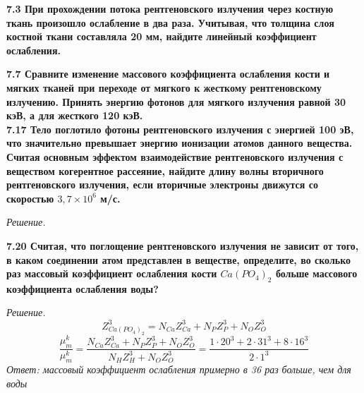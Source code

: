 \documentclass[a4paper, fontsize=14pt]{extreport}
\begin{document}
\textbf{7.3 При прохождении потока рентгеновского излучения через костную ткань произошло ослабление в два раза. Учитывая, что толщина слоя костной ткани составляла 20 мм, найдите линейный коэффициент ослабления.}
%
%
%
%

\textbf{7.7 Сравните изменение массового коэффициента ослабления кости и мягких тканей при переходе от мягкого к жесткому рентгеновскому излучению. Принять энергию фотонов для мягкого излучения равной 30 кэВ, а для жесткого 120 кэВ.} \\
%
%
%
%

\textbf{7.17 Тело поглотило фотоны рентгеновского излучения с энергией 100 эВ, что значительно превышает энергию ионизации атомов данного вещества. Считая основным эффектом взаимодействие рентгеновского излучения с веществом когерентное рассеяние, найдите длину волны вторичного рентгеновского излучения, если вторичные электроны движутся со скоростью $3,7 \times 10^6$ м/с.}

\textit{Решение.\\
%
}

\textbf{7.20 Считая, что поглощение рентгеновского излучения не зависит от того, в каком соединении атом представлен в веществе, определите, во сколько раз массовый коэффициент ослабления кости $Ca(PO_4)_2$ больше массового коэффициента ослабления воды? }

\textit{Решение.\\
%
\begin{equation}
  Z_{Ca(PO_4)_2}^3 = N_{Ca}Z_{Ca}^3+N_{P}Z_{P}^3+N_{O}Z_{O}^3
\end{equation}
\begin{equation}
  \frac{\mu_m^k}{\mu_m^k} = \frac{N_{Ca}Z_{Ca}^3+N_{P}Z_{P}^3+N_{O}Z_{O}^3}{N_{H}Z_{H}^3+N_{O}Z_{O}^3} = \frac{1 \cdot 20^3 + 2 \cdot 31^3 + 8 \cdot 16^3}{2 \cdot 1^3 }
\end{equation}
Ответ: массовый коэффициент ослабления примерно в 36 раз больше, чем для воды
 }
\end{document}
